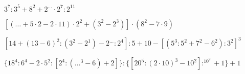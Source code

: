 \begin{esercizio} %
\(3^7:3^5+8^2+2^{\dots}\cdot2^7:2^{11}\) 
\end{esercizio}
\begin{esercizio} %
\([({\dots}+5\cdot2-2\cdot11)\cdot2^2+(3^2-2^3)]\cdot(8^2-7\cdot9)\) 
\end{esercizio}
\begin{esercizio} %
\([14+(13-6)^2:(3^2-2^1)-2^{\dots}:2^4]:5+10-[(5^3:5^2+7^2-6^2):3^2]^3\)
\end{esercizio}
\begin{esercizio} %
\(\{18^4:6^4-2\cdot5^2:[2^4:({\dots}^3-6)+2]\}:
\{[20^5:(2\cdot10)^3-10^2]:^10^2+1\}+1\) 
\end{esercizio}


